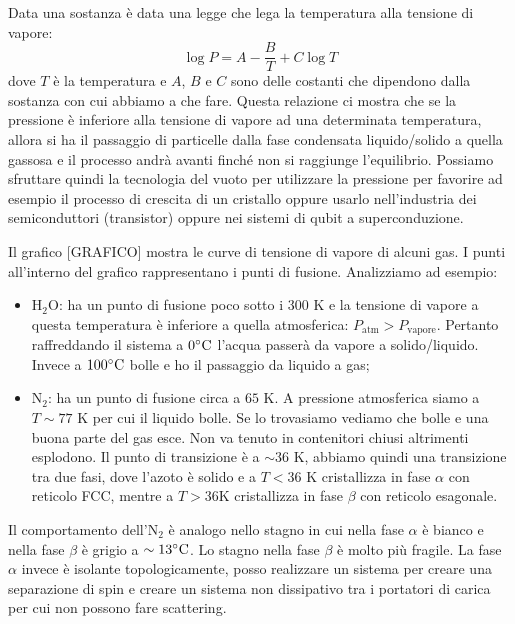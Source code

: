 Data una sostanza è data una legge che lega la temperatura alla tensione di vapore:
\begin{equation*}
    \log{P}=A-\frac{B}{T}+C\log{T}
\end{equation*}
dove $T$ è la temperatura e $A$, $B$ e $C$ sono delle costanti che dipendono dalla sostanza con cui abbiamo a che fare.
Questa relazione ci mostra che se la pressione è inferiore alla tensione di vapore ad una determinata temperatura, allora si ha il passaggio di particelle dalla fase condensata liquido/solido a quella gassosa e il processo andrà avanti finché non si raggiunge l'equilibrio. Possiamo sfruttare quindi la tecnologia del vuoto per utilizzare la pressione per favorire ad esempio il processo di crescita di un cristallo oppure usarlo nell'industria dei semiconduttori (transistor) oppure nei sistemi di qubit a superconduzione.

Il grafico [GRAFICO] mostra le curve di tensione di vapore di alcuni gas. I punti all'interno del grafico rappresentano i punti di fusione. Analizziamo ad esempio:
\begin{itemize}
    \item $\text{H}_2\text{O}$: ha un punto di fusione poco sotto i $300\text{ K}$ e la tensione di vapore a questa temperatura è inferiore a quella atmosferica: $P_\text{atm}>P_\text{vapore}$. Pertanto raffreddando il sistema a $0\text{\degree C}$ l'acqua passerà da vapore a solido/liquido. Invece a $100\text{\degree C}$ bolle e ho il passaggio da liquido a gas;
    \item $\text{N}_2$: ha un punto di fusione circa a $65\text{ K}$. A pressione atmosferica siamo a $T \sim 77\text{ K}$ per cui il liquido bolle. Se lo trovasiamo vediamo che bolle e una buona parte del gas esce. Non va tenuto in contenitori chiusi altrimenti esplodono. Il punto di transizione è a $\sim 36\text{ K}$, abbiamo quindi una transizione tra due fasi, dove l'azoto è solido e a $T < 36 \text{ K}$ cristallizza in fase $\alpha$ con reticolo FCC, mentre a $T > 36 \text{K}$ cristallizza in fase $\beta$ con reticolo esagonale.
\end{itemize}
Il comportamento dell'$\text{N}_2$ è analogo nello stagno in cui nella fase $\alpha$ è bianco e nella fase $\beta$ è grigio a $\sim 13\text{\degree C}$. Lo stagno nella fase $\beta$ è molto più fragile. La fase $\alpha$ invece è isolante topologicamente, posso realizzare un sistema per creare una separazione di spin e creare un sistema non dissipativo tra i portatori di carica per cui non possono fare scattering.
